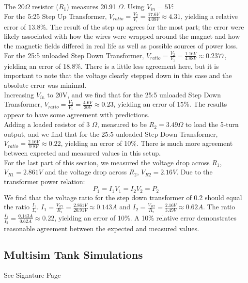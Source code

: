 \documentclass{article}
\begin{document}
    The 20$\Omega$ resistor ($R_1$) measures 20.91 $\Omega$.
    Using $V_{in} = 5V$:\\\indent For the 5:25 Step Up Transformer, $V_{ratio} = \frac{V_2}{V_1} = \frac{17.6V}{4.08V} \approx 4.31$, yielding a relative error of 13.8\%. The result of the step up agrees for the most part; the error were likely associated with how the wires were wrapped around the magnet and how the magnetic fields differed in real life as well as possible sources of power loss. \\\indent For the 25:5 unloaded Step Down Transformer, $V_{ratio} = \frac{V_2}{V_1} = \frac{1.16V}{4.88V} \approx 0.2377$, yielding an error of 18.8\%. There is a little less agreement here, but it is important to note that the voltage clearly stepped down in this case and the absolute error was minimal. \\\indent Increasing $V_{in}$ to 20V, and we find that for the 25:5 unloaded Step Down Transformer, $V_{ratio} = \frac{V_2}{V_1} = \frac{4.6V}{20V} \approx 0.23$, yielding an error of 15\%. The results appear to have some agreement with predictions. \\\indent Adding a loaded resistor of 3 $\Omega$, measured to be $R_2 = 3.49\Omega$ to load the 5-turn output, and we find that for the 25:5 unloaded Step Down Transformer, $V_{ratio} = \frac{2.16V}{9.8V} \approx 0.22$, yielding an error of 10\%. There is much more agreement between expected and measured values in this setup. \\\indent For the last part of this section, we measured the voltage drop across $R_1$, $V_{R1} = 2.861V$ and the voltage drop across $R_2$, $V_{R2} = 2.16V$. Due to the transformer power relation:
    \begin{equation}
        P_1 = I_1 V_1 = I_2 V_2 = P_2
    \end{equation}
    We find that the voltage ratio for the step down transformer of 0.2 should equal the ratio $\frac{I_1}{I_2}$. $I_1 = \frac{V_{R1}}{R_1} = \frac{2.861V}{20.91V} \approx 0.143A$ and $I_2 = \frac{V_{R2}}{R_2} = \frac{2.16V}{3.49V} \approx 0.62A$. The ratio $\frac{I_1}{I_2} = \frac{0.143A}{0.62A} \approx 0.22$, yielding an error of 10\%. A 10\% relative error demonstrates reasonable agreement between the expected and measured values.\\

\subsection{Multisim Tank Simulations}
    See Signature Page
\end{document}
